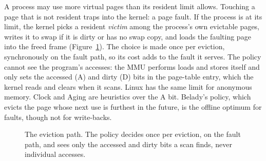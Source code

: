 \documentclass{article}
\newcommand{\clock}{Clock\xspace}
\newcommand{\belady}{Belady\xspace}
\begin{document}
A process may use more virtual pages than its resident limit allows. Touching a page
that is not resident traps into the kernel: a page fault. If the process is at its
limit, the kernel picks a resident \emph{victim} among the process's own evictable
pages, writes it to swap if it is dirty or has no swap copy, and loads the faulting page
into the freed frame (Figure~\ref{fig:mechanism}). The choice is made once per eviction,
synchronously on the fault path, so its cost adds to the fault it serves. The policy
cannot see the program's accesses: the MMU performs loads and stores itself and only
sets the accessed (A) and dirty (D) bits in the page-table entry, which the kernel reads
and clears when it scans. Linux has the same limit for anonymous memory. \clock and
Aging are heuristics over the A bit. \belady's policy, which evicts the page whose next
use is furthest in the future, is the offline optimum for faults, though not for
write-backs.

\begin{figure}[t]
\centering
{}
\caption{The eviction path. The policy decides once per eviction, on the fault path,
and sees only the accessed and dirty bits a scan finds, never individual accesses.}
\label{fig:mechanism}
\end{figure}
\end{document}
